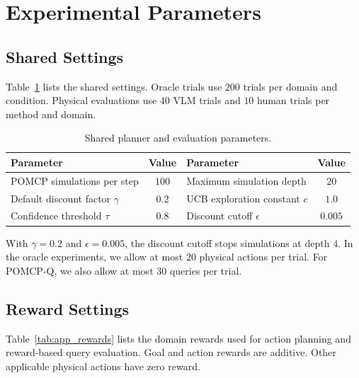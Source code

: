 \section{Experimental Parameters}\label{appx:settings}
\subsection{Shared Settings}\label{appx:planner_params}
Table~\ref{tab:app_planner_params} lists the shared settings. Oracle trials use $200$ trials per domain and condition. Physical evaluations use $40$ VLM trials and $10$ human trials per method and domain.

\begin{table}[!htbp]
\centering
\caption{Shared planner and evaluation parameters.}
\label{tab:app_planner_params}
\small
\begin{tabular*}{\textwidth}{@{\extracolsep{\fill}}lclc@{}}
\toprule
Parameter & Value & Parameter & Value \\
\midrule
POMCP simulations per step & $100$ & Maximum simulation depth & $20$ \\
Default discount factor $\gamma$ & $0.2$ & UCB exploration constant $c$ & $1.0$ \\
Confidence threshold $\tau$ & $0.8$ & Discount cutoff $\epsilon$ & $0.005$ \\
\bottomrule
\end{tabular*}
\end{table}
With $\gamma=0.2$ and $\epsilon=0.005$, the discount cutoff stops simulations at depth $4$. In the oracle experiments, we allow at most $20$ physical actions per trial. For POMCP-Q, we also allow at most $30$ queries per trial.

\subsection{Reward Settings}\label{appx:rewards}
Table~\ref{tab:app_rewards} lists the domain rewards used for action planning and reward-based query evaluation. Goal and action rewards are additive. Other applicable physical actions have zero reward.

